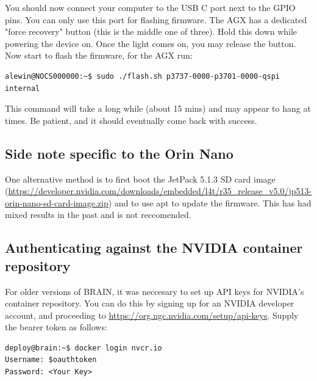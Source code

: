\documentclass[11pt]{article}
\begin{document}
You should now connect your computer to the USB C port next to the GPIO pins. You can only use this port for flashing firmware. The AGX has a dedicated "force recovery" button (this is the middle one of three). Hold this down while powering the device on. Once the light comes on, you may release the button. Now start to flash the firmware, for the AGX run:

\lstset{style=console}
\begin{lstlisting}
alewin@NOCS000000:~$ sudo ./flash.sh p3737-0000-p3701-0000-qspi internal
\end{lstlisting}

This command will take a long while (about 15 mins) and may appear to hang at times. Be patient, and it should eventually come back with success.

\subsection*{Side note specific to the Orin Nano}

One alternative method is to first boot the JetPack 5.1.3 SD card image (\href{https://developer.nvidia.com/downloads/embedded/l4t/r35_release_v5.0/jp513-orin-nano-sd-card-image.zip}{https://developer.nvidia.com/downloads/embedded/l4t/r35\_release\_v5.0/jp513-orin-nano-sd-card-image.zip}) and to use apt to update the firmware. This has had mixed results in the past and is not reccomended.

\subsection{Authenticating against the NVIDIA container repository}

For older versions of BRAIN, it was neccesary to set up API keys for NVIDIA's container repository. You can do this by signing up for an NVIDIA developer account, and proceeding to \href{https://org.ngc.nvidia.com/setup/api-keys}{https://org.ngc.nvidia.com/setup/api-keys}. Supply the bearer token as follows:

\lstset{style=console}
\begin{lstlisting}
deploy@brain:~$ docker login nvcr.io
Username: $oauthtoken
Password: <Your Key>
\end{lstlisting}

\printbibliography
\end{document}
